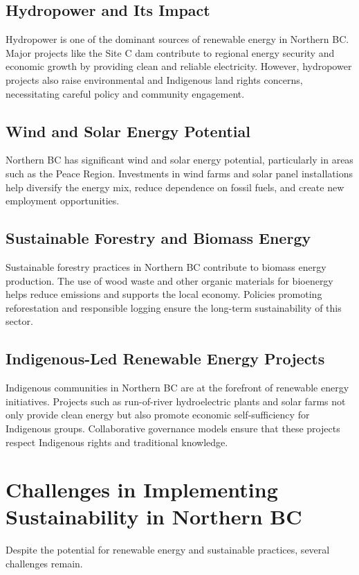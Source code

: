\documentclass[12pt]{article}
\begin{document}
\subsection{Hydropower and Its Impact}
Hydropower is one of the dominant sources of renewable energy in Northern BC. Major projects like the Site C dam contribute to regional energy security and economic growth by providing clean and reliable electricity. However, hydropower projects also raise environmental and Indigenous land rights concerns, necessitating careful policy and community engagement.

\subsection{Wind and Solar Energy Potential}
Northern BC has significant wind and solar energy potential, particularly in areas such as the Peace Region. Investments in wind farms and solar panel installations help diversify the energy mix, reduce dependence on fossil fuels, and create new employment opportunities.

\subsection{Sustainable Forestry and Biomass Energy}
Sustainable forestry practices in Northern BC contribute to biomass energy production. The use of wood waste and other organic materials for bioenergy helps reduce emissions and supports the local economy. Policies promoting reforestation and responsible logging ensure the long-term sustainability of this sector.

\subsection{Indigenous-Led Renewable Energy Projects}
Indigenous communities in Northern BC are at the forefront of renewable energy initiatives. Projects such as run-of-river hydroelectric plants and solar farms not only provide clean energy but also promote economic self-sufficiency for Indigenous groups. Collaborative governance models ensure that these projects respect Indigenous rights and traditional knowledge.

\section{Challenges in Implementing Sustainability in Northern BC}
Despite the potential for renewable energy and sustainable practices, several challenges remain. 
\end{document}
